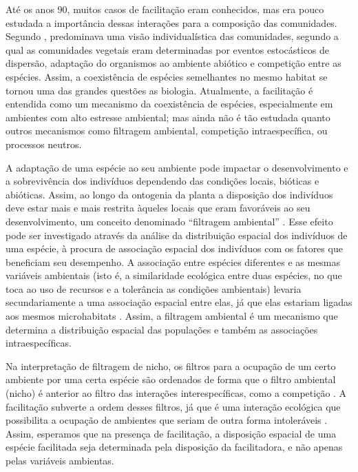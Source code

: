 \documentclass[twoside,12pt,a4paper]{report}
\begin{document}
Até os anos 90, muitos casos de facilitação eram conhecidos, mas era pouco estudada a importância
dessas interações para a composição das comunidades. Segundo \citep{CallawayBook}, predominava uma visão
individualística das comunidades, segundo a qual as comunidades vegetais eram determinadas por
eventos estocásticos de dispersão, adaptação do organismos ao ambiente abiótico e competição entre
as espécies. Assim, a coexistência de espécies semelhantes no mesmo habitat se tornou uma das
grandes questões as biologia. Atualmente, a facilitação é entendida como um mecanismo da
coexistência de espécies, especialmente em ambientes com alto estresse ambiental; mas ainda não é
tão estudada quanto outros mecanismos como filtragem ambiental, competição intraespecífica, ou
processos neutros.


A adaptação de uma espécie ao seu ambiente pode impactar o desenvolvimento e a sobrevivência dos
indivíduos dependendo das condições locais, bióticas e abióticas. Assim, ao longo da ontogenia da
planta a disposição dos indivíduos deve estar mais e mais restrita àqueles locais que eram
favoráveis ao seu desenvolvimento, um conceito denominado “filtragem ambiental” \citep{ref}. Esse efeito
pode ser investigado através da análise da distribuição espacial dos indivíduos de uma espécie, à
procura de associação espacial dos indivíduos com os fatores que beneficiam seu desempenho. A
associação entre espécies diferentes e as mesmas variáveis ambientais (isto é, a similaridade
ecológica entre duas espécies, no que toca ao uso de recursos e a tolerância as condições
ambientais) levaria secundariamente a uma associação espacial entre elas, já que elas estariam
ligadas aos mesmos microhabitats \citep{Velazquez2015}. Assim, a filtragem ambiental é um
mecanismo que determina a distribuição espacial das populações e também as associações
intraespecíficas.

Na interpretação de filtragem de nicho, os filtros para a ocupação de um certo ambiente por uma
certa espécie são ordenados de forma que o filtro ambiental (nicho) é anterior ao filtro das
interações interespecíficas, como a competição \citep{Grimes}. A facilitação subverte a ordem desses
filtros, já que é uma interação ecológica que possibilita a ocupação de ambientes que seriam de
outra forma intoleráveis \citep{Lortie2004}. Assim, esperamos que na presença de facilitação, a
disposição espacial de uma espécie facilitada seja determinada pela disposição da facilitadora, e
não apenas pelas variáveis ambientas.
\end{document}
